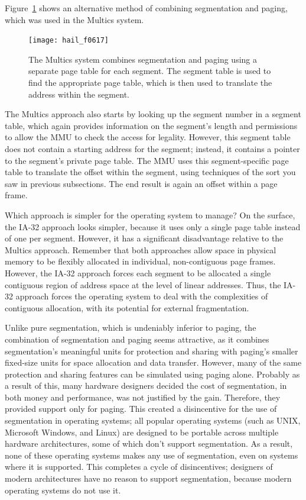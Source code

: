 Figure~\ref{scan-6-10} shows an alternative method of combining
segmentation and paging, which was used in the Multics system.
\begin{figure}
\centerline{\texttt{[image: hail\_f0617]}}
\caption{The Multics system combines segmentation and paging using a
  separate page table for each segment.  The segment table is used to
  find the appropriate page table, which is then used to translate the
  address within the segment.}
\label{scan-6-10}
\end{figure}
The Multics approach also starts by looking up the segment number in a
segment table, which again provides information on the segment's
length and permissions to allow the MMU to check the access for
legality.  However, this segment table does not contain a starting
address for the segment; instead, it contains a pointer to the
segment's private page table.  The MMU uses this segment-specific page
table to translate the offset within the segment, using techniques of
the sort you saw in previous subsections.  The end result is again an
offset within a page frame.

Which approach is simpler for the operating system to manage?  On the
surface, the IA-32 approach looks simpler, because it uses only a
single page table instead of one per segment.  However, it has a
significant disadvantage relative to the Multics approach.  Remember
that both approaches allow space in physical memory to be flexibly
allocated in individual, non-contiguous page frames.  However, the
IA-32 approach forces each segment to be allocated a single contiguous
region of address space at the level of linear addresses.  Thus, the
IA-32 approach forces the operating system to deal with the
complexities of contiguous allocation, with its potential for external
fragmentation.

Unlike pure segmentation, which is undeniably inferior to paging, the
combination of segmentation and paging seems attractive, as it combines
segmentation's meaningful units for protection and sharing with
paging's smaller fixed-size units for space allocation and data transfer.
However, many of the same protection and sharing features can be
simulated using paging alone.  Probably as a result of this, many
hardware designers decided the cost of segmentation, in both money and
performance, was not justified by the gain.  Therefore, they provided support
only for paging.  This created a disincentive for the use of
segmentation in operating systems; all popular operating systems (such as UNIX,
Microsoft Windows, and Linux) are designed to be portable across
multiple hardware architectures, some of which don't support
segmentation.  As a result, none of these operating systems makes
any use of segmentation, even on systems where it is supported.  This
completes a cycle of disincentives; designers of modern architectures
have no reason to support segmentation, because modern operating
systems do not use it.

